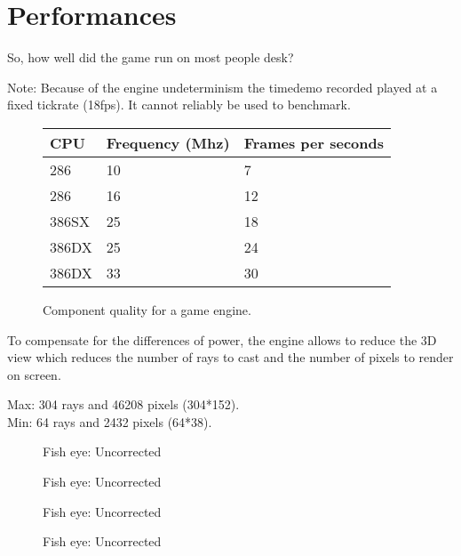 \section{Performances}
So, how well did the game run on most people desk?

Note: Because of the engine undeterminism the timedemo recorded played at a fixed tickrate (18fps). It cannot reliably be used to benchmark.

\begin{figure}[H]
\centering
\begin{tabularx}{\textwidth}{ X X X }
  \toprule
  \textbf{CPU} & \textbf{Frequency (Mhz)} & \textbf{Frames per seconds} \\ \bottomrule
  286 & 10 & 7 \\
286 & 16 & 12 \\
386SX & 25 &  18 \\
386DX & 25 & 24 \\
386DX & 33 & 30 \\ \bottomrule
\end{tabularx}
\caption{Component quality for a game engine.}
\end{figure}

To compensate for the differences of power, the engine allows to reduce the 3D view which reduces the number of rays to cast and the number of pixels to render on screen.

Max: 304 rays and 46208 pixels (304*152).\\
Min:  64 rays and  2432 pixels (64*38).




  \begin{figure}[H]
\centering
  \caption{Fish eye: Uncorrected} 
 \end{figure}
 \par

   \begin{figure}[H]
\centering
  \caption{Fish eye: Uncorrected} 
 \end{figure}
 \par

   \begin{figure}[H]
\centering
  \caption{Fish eye: Uncorrected} 
 \end{figure}
 \par


    \begin{figure}[H]
\centering
  \caption{Fish eye: Uncorrected} 
 \end{figure}
 \par